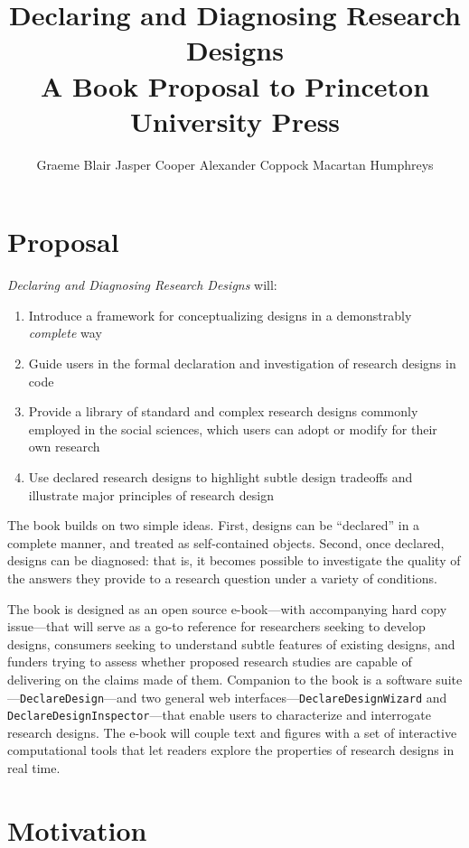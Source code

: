 \documentclass[11pt]{article}
\title{Declaring and Diagnosing Research Designs \\ {\normalsize A Book Proposal to Princeton University Press}}
\author{Graeme Blair \quad Jasper Cooper \quad Alexander Coppock \quad Macartan Humphreys}
\begin{document}
\maketitle


\section{Proposal}

\noindent \textit{Declaring and Diagnosing Research Designs} will:

\begin{enumerate}
	\item Introduce a framework for conceptualizing designs in a demonstrably \textit{complete} way
	\item Guide users in the formal declaration and investigation of research designs in code
	\item Provide a library of standard and complex research designs commonly employed in the social sciences, which users can adopt or modify for their own research
	\item Use declared research designs to highlight subtle design tradeoffs and illustrate major principles of research design
\end{enumerate}

The book builds on two simple ideas. First, designs can be ``declared'' in a complete manner, and treated as self-contained objects. Second, once declared, designs can be diagnosed: that is, it becomes possible to investigate the quality of the answers they provide to a research question under a variety of conditions.   

The book is designed as an open source e-book---with accompanying hard copy issue---that will serve as a go-to reference for researchers seeking to develop designs, consumers seeking to understand subtle features of existing designs, and funders trying to assess whether proposed research studies are capable of delivering on the claims made of them. Companion to the book is a software suite---\texttt{DeclareDesign}---and two general web interfaces---\texttt{DeclareDesignWizard} and \texttt{DeclareDesignInspector}---that enable users to characterize and interrogate research designs. The e-book will couple text and figures with a set of interactive computational tools that let readers explore the properties of research designs in real time. 

\section{Motivation}
\end{document}
